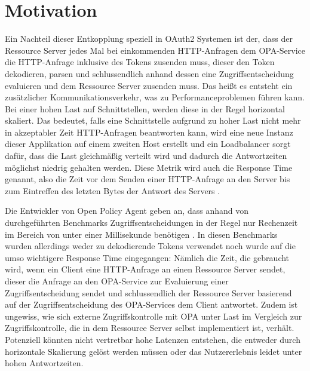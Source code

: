 \section{Motivation}
\label{sec:intro:motivation}
Ein Nachteil dieser Entkopplung speziell in OAuth2 Systemen ist der, dass der Ressource Server jedes Mal bei einkommenden HTTP-Anfragen dem OPA-Service die HTTP-Anfrage inklusive des Tokens zusenden muss, dieser den Token dekodieren, parsen und schlussendlich anhand dessen eine Zugriffsentscheidung evaluieren und dem Ressource Server zusenden muss. Das heißt es entsteht ein zusätzlicher Kommunikationsverkehr, was zu Performanceproblemen führen kann. Bei einer hohen Last auf Schnittstellen, werden diese in der Regel horizontal skaliert. Das bedeutet, falls eine Schnittstelle aufgrund zu hoher Last nicht mehr in akzeptabler Zeit HTTP-Anfragen beantworten kann, wird eine neue Instanz dieser Applikation auf einem zweiten Host erstellt und ein Loadbalancer sorgt dafür, dass die Last gleichmäßig verteilt wird und dadurch die Antwortzeiten möglichst niedrig gehalten werden. Diese Metrik wird auch die Response Time genannt, also die Zeit vor dem Senden einer HTTP-Anfrage an den Server bis zum Eintreffen des letzten Bytes der Antwort des Servers \citep{jmeterglossary:2021}.\smallskip

Die Entwickler von Open Policy Agent geben an, dass anhand von durchgeführten Benchmarks Zugriffsentscheidungen in der Regel nur Rechenzeit im Bereich von unter einer Millisekunde benötigen \citep{opaperformance:2021:07}. In diesen Benchmarks wurden allerdings weder zu dekodierende Tokens verwendet noch wurde auf die umso wichtigere Response Time eingegangen: Nämlich die Zeit, die gebraucht wird, wenn ein Client eine HTTP-Anfrage an einen Ressource Server sendet, dieser die Anfrage an den OPA-Service zur Evaluierung einer Zugriffsentscheidung sendet und schlussendlich der Ressource Server basierend auf der Zugriffsentscheidung des OPA-Services dem Client antwortet. Zudem ist ungewiss, wie sich externe Zugriffskontrolle mit OPA unter Last im Vergleich zur Zugriffskontrolle, die in dem Ressource Server selbst implementiert ist, verhält. Potenziell könnten nicht vertretbar hohe Latenzen entstehen, die entweder durch horizontale Skalierung gelöst werden müssen oder das Nutzererlebnis leidet unter hohen Antwortzeiten.

%
%
